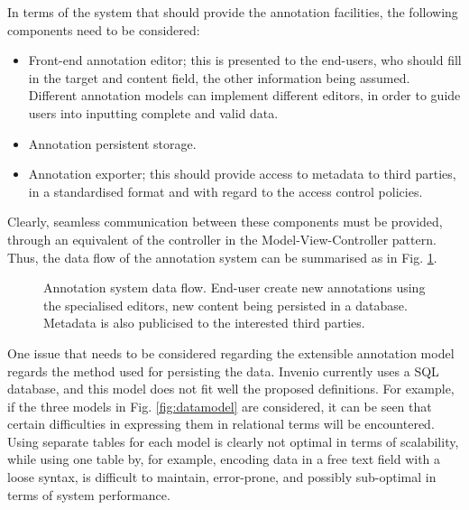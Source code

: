 In terms of the system that should provide the annotation facilities, the
following components need to be considered:
\begin{itemize}
  \item Front-end annotation editor; this is presented to the end-users,
        who should fill in the target and content field, the other information
        being assumed. Different annotation models can implement different
        editors, in order to guide users into inputting complete and valid data.
  \item Annotation persistent storage.
  \item Annotation exporter; this should provide access to metadata to third
        parties, in a standardised format and with regard to the access control
        policies.
\end{itemize}
Clearly, seamless communication between these components must be provided,
through an equivalent of the controller in the Model-View-Controller pattern.
Thus, the data flow of the annotation system can be summarised as in Fig.
\ref{fig:dataflow}.

\begin{figure}[!ht]
  \centering
  \caption[Annotation system data flow]
          {Annotation system data flow. End-user create new annotations using
           the specialised editors, new content being persisted in a database.
           Metadata is also publicised to the interested third parties.}
  \label{fig:dataflow}
\end{figure}

One issue that needs to be considered regarding the extensible annotation model
regards the method used for persisting the data. Invenio currently uses a SQL
database, and this model does not fit well the proposed definitions. For
example, if the three models in Fig. \ref{fig:datamodel} are considered, it can
be seen that certain difficulties in expressing them in relational terms will
be encountered. Using separate tables for each model is clearly not optimal in
terms of scalability, while using one table by, for example, encoding data in a
free text field with a loose syntax, is difficult to maintain, error-prone, and
possibly sub-optimal in terms of system performance.

